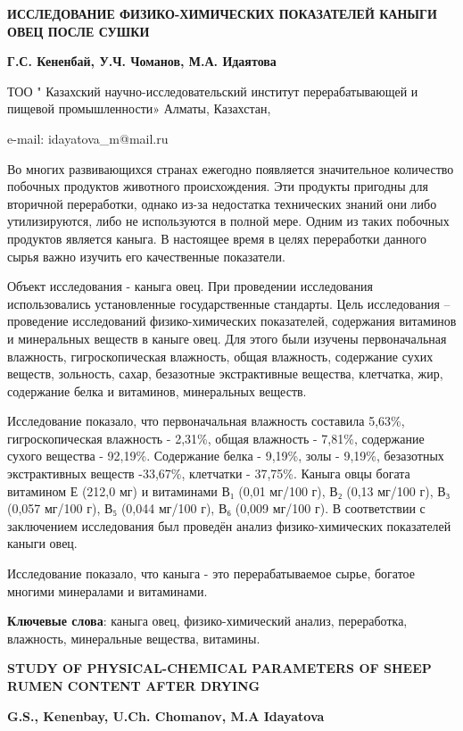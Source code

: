 \begin{header}
{\bfseries ИССЛЕДОВАНИЕ ФИЗИКО-ХИМИЧЕСКИХ ПОКАЗАТЕЛЕЙ КАНЫГИ ОВЕЦ ПОСЛЕ СУШКИ}

{\bfseries
Г.С. Кененбай,
У.Ч. Чоманов,
М.А. Идаятова\envelope
}
\end{header}

\begin{affil}
ТОО " Казахский научно-исследовательский институт перерабатывающей и пищевой промышленности» Алматы, Казахстан,

e-mail: idayatova\_m@mail.ru
\end{affil}

Во многих развивающихся странах ежегодно появляется значительное
количество побочных продуктов животного происхождения. Эти продукты
пригодны для вторичной переработки, однако из-за недостатка технических
знаний они либо утилизируются, либо не используются в полной мере. Одним
из таких побочных продуктов является каныга. В настоящее время в целях
переработки данного сырья важно изучить его качественные показатели.

Объект исследования - каныга овец. При проведении исследования
использовались установленные государственные стандарты. Цель
исследования -- проведение исследований физико-химичес\-ких показателей,
содержания витаминов и минеральных веществ в каныге овец. Для этого были
изучены первоначальная влажность, гигроскопическая влажность, общая
влажность, содержание сухих веществ, зольность, сахар, безазотные
экстрактивные вещества, клетчатка, жир, содержание белка и витаминов,
минеральных веществ.

Исследование показало, что первоначальная влажность составила 5,63\%,
гигроскопическая влажность - 2,31\%, общая влажность - 7,81\%,
содержание сухого вещества - 92,19\%. Содержание белка - 9,19\%, золы -
9,19\%, безазотных экстрактивных веществ -33,67\%, клетчатки - 37,75\%.
Каныга овцы богата витамином Е (212,0 мг) и витаминами В₁ (0,01 мг/100
г), В₂ (0,13 мг/100 г), В₃ (0,057 мг/100 г), В₅ (0,044 мг/100 г), В₆
(0,009 мг/100 г). В соответствии с заключением исследования был проведён
анализ физико-химических показателей каныги овец.

Исследование показало, что каныга - это перерабатываемое сырье, богатое
многими минералами и витаминами.

{\bfseries Ключевые слова}: каныга овец, физико-химический анализ,
переработка, влажность, минеральные вещества, витамины.

\begin{header}
{\bfseries STUDY OF PHYSICAL-CHEMICAL PARAMETERS OF SHEEP RUMEN CONTENT AFTER DRYING}

{\bfseries
G.S., Kenenbay,
U.Ch. Chomanov,
M.A Idayatova\envelope
}
\end{header}

